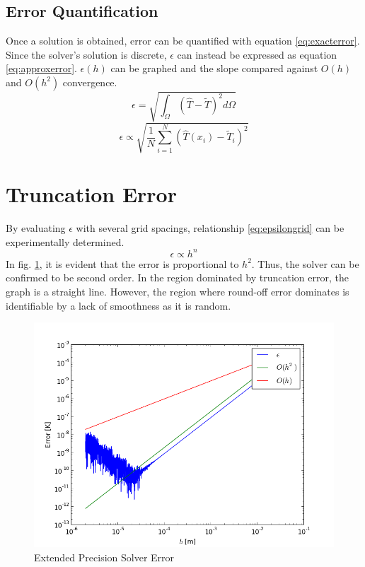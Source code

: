 \documentclass[12pt,twocolumn]{article}
\begin{document}
\subsection*{Error Quantification}
Once a solution is obtained, error
can be quantified with equation \eqref{eq:exacterror}. Since the solver's solution is discrete, $\epsilon$ can instead be expressed as equation \eqref{eq:approxerror}.
$\epsilon (h)$ can be graphed and the slope compared against $O(h)$ and $O(h^2)$ convergence.
\begin{equation}\label{eq:exacterror}\epsilon = \sqrt{\int_\Omega (\hat T-\tilde T )^2d\Omega}\end{equation}
\begin{equation}\label{eq:approxerror}\epsilon \propto \sqrt{\frac{1}{N}\sum\limits_{i=1}^N (\hat T (x_i)-\tilde T_i)^2}\end{equation}

\section*{Truncation Error}
By evaluating $\epsilon$ with several grid spacings, relationship \eqref{eq:epsilongrid} can be experimentally determined.
\begin{equation}\label{eq:epsilongrid}\epsilon\propto h^n \end{equation}
In fig. \ref{fig:eperror}, it is evident that the error is proportional to $h^2$. Thus, the solver can be confirmed to be second order.
In the region dominated by truncation error, the graph is a straight line. However, the region where round-off error dominates is
identifiable by a lack of smoothness as it is random.
\begin{figure}
\includegraphics[width=\columnwidth]{plots/eperror.png}
\caption{Extended Precision Solver Error}
\label{fig:eperror}
\end{figure}
\end{document}
